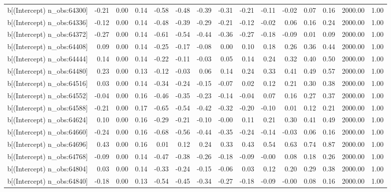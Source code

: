 \begin{table}[ht]
\begin{tabular}{rrrrrrrrrrrrrrr}
  b[(Intercept) n\_obs:64300] & -0.21 & 0.00 & 0.14 & -0.58 & -0.48 & -0.39 & -0.31 & -0.21 & -0.11 & -0.02 & 0.07 & 0.16 & 2000.00 & 1.00 \\ 
  b[(Intercept) n\_obs:64336] & -0.12 & 0.00 & 0.14 & -0.48 & -0.39 & -0.29 & -0.21 & -0.12 & -0.02 & 0.06 & 0.16 & 0.24 & 2000.00 & 1.00 \\ 
  b[(Intercept) n\_obs:64372] & -0.27 & 0.00 & 0.14 & -0.61 & -0.54 & -0.44 & -0.36 & -0.27 & -0.18 & -0.09 & 0.01 & 0.09 & 2000.00 & 1.00 \\ 
  b[(Intercept) n\_obs:64408] & 0.09 & 0.00 & 0.14 & -0.25 & -0.17 & -0.08 & 0.00 & 0.10 & 0.18 & 0.26 & 0.36 & 0.44 & 2000.00 & 1.00 \\ 
  b[(Intercept) n\_obs:64444] & 0.14 & 0.00 & 0.14 & -0.22 & -0.11 & -0.03 & 0.05 & 0.14 & 0.24 & 0.32 & 0.40 & 0.50 & 2000.00 & 1.00 \\ 
  b[(Intercept) n\_obs:64480] & 0.23 & 0.00 & 0.13 & -0.12 & -0.03 & 0.06 & 0.14 & 0.24 & 0.33 & 0.41 & 0.49 & 0.57 & 2000.00 & 1.00 \\ 
  b[(Intercept) n\_obs:64516] & 0.03 & 0.00 & 0.14 & -0.34 & -0.24 & -0.15 & -0.07 & 0.02 & 0.12 & 0.21 & 0.30 & 0.38 & 2000.00 & 1.00 \\ 
  b[(Intercept) n\_obs:64552] & -0.04 & 0.00 & 0.16 & -0.46 & -0.35 & -0.23 & -0.14 & -0.04 & 0.07 & 0.16 & 0.27 & 0.37 & 2000.00 & 1.00 \\ 
  b[(Intercept) n\_obs:64588] & -0.21 & 0.00 & 0.17 & -0.65 & -0.54 & -0.42 & -0.32 & -0.20 & -0.10 & 0.01 & 0.12 & 0.21 & 2000.00 & 1.00 \\ 
  b[(Intercept) n\_obs:64624] & 0.10 & 0.00 & 0.16 & -0.29 & -0.21 & -0.10 & -0.00 & 0.11 & 0.21 & 0.30 & 0.41 & 0.49 & 2000.00 & 1.00 \\ 
  b[(Intercept) n\_obs:64660] & -0.24 & 0.00 & 0.16 & -0.68 & -0.56 & -0.44 & -0.35 & -0.24 & -0.14 & -0.03 & 0.06 & 0.16 & 2000.00 & 1.00 \\ 
  b[(Intercept) n\_obs:64696] & 0.43 & 0.00 & 0.16 & 0.01 & 0.12 & 0.24 & 0.33 & 0.43 & 0.54 & 0.63 & 0.74 & 0.87 & 2000.00 & 1.00 \\ 
  b[(Intercept) n\_obs:64768] & -0.09 & 0.00 & 0.14 & -0.47 & -0.38 & -0.26 & -0.18 & -0.09 & -0.00 & 0.08 & 0.18 & 0.26 & 2000.00 & 1.00 \\ 
  b[(Intercept) n\_obs:64804] & 0.03 & 0.00 & 0.14 & -0.33 & -0.24 & -0.15 & -0.06 & 0.03 & 0.12 & 0.20 & 0.29 & 0.38 & 2000.00 & 1.00 \\ 
  b[(Intercept) n\_obs:64840] & -0.18 & 0.00 & 0.13 & -0.54 & -0.45 & -0.34 & -0.27 & -0.18 & -0.09 & -0.00 & 0.08 & 0.16 & 2000.00 & 1.00 \\ 

\end{tabular}
\end{table}

